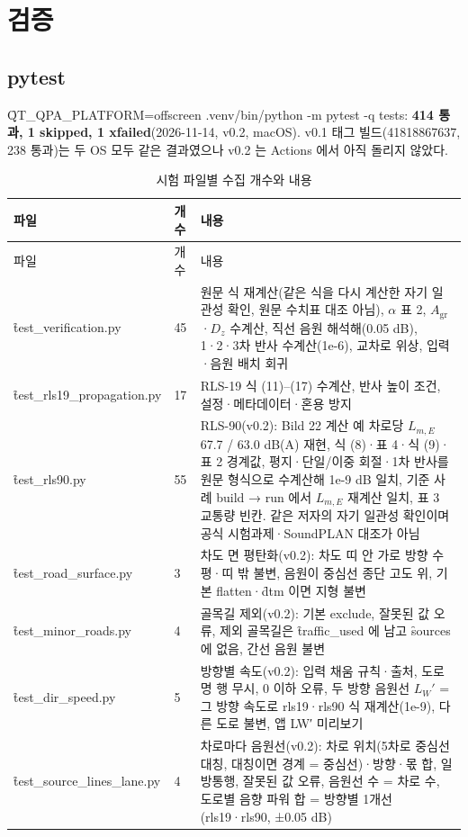 \documentclass[10.5pt,a4paper]{article}
\begin{document}
\section{검증}

\subsection{pytest}
\f{QT\_QPA\_PLATFORM=offscreen .venv/bin/python -m pytest -q tests}: \textbf{414 통과, 1 skipped, 1 xfailed}(2026-11-14, v0.2, macOS). v0.1 태그 빌드(41818867637, 238 통과)는 두 OS 모두 같은 결과였으나 v0.2 는 Actions 에서 아직 돌리지 않았다.
\begin{longtable}{P{52mm}P{10mm}P{90mm}}
\caption{시험 파일별 수집 개수와 내용}\label{tab:tests}\\
\toprule 파일 & 개수 & 내용 \\ \midrule\endfirsthead
\toprule 파일 & 개수 & 내용 \\ \midrule\endhead
\f{test\_verification.py} & 45 & 원문 식 재계산(같은 식을 다시 계산한 자기 일관성 확인, 원문 수치표 대조 아님), $\alpha$ 표 2, $A_\mathrm{gr}$·$D_z$ 수계산, 직선 음원 해석해(0.05 dB), 1·2·3차 반사 수계산(1e-6), 교차로 위상, 입력·음원 배치 회귀 \\
\f{test\_rls19\_propagation.py} & 17 & RLS-19 식 (11)–(17) 수계산, 반사 높이 조건, 설정·메타데이터·혼용 방지 \\
\f{test\_rls90.py} & 55 & RLS-90(v0.2): Bild 22 계산 예 차로당 $L_{m,E}$ 67.7 / 63.0 dB(A) 재현, 식 (8)·표 4·식 (9)·표 2 경계값, 평지·단일/이중 회절·1차 반사를 원문 형식으로 수계산해 1e-9 dB 일치, 기준 사례 build → run 에서 $L_{m,E}$ 재계산 일치, 표 3 교통량 빈칸. 같은 저자의 자기 일관성 확인이며 공식 시험과제·SoundPLAN 대조가 아님 \\
\f{test\_road\_surface.py} & 3 & 차도 면 평탄화(v0.2): 차도 띠 안 가로 방향 수평·띠 밖 불변, 음원이 중심선 종단 고도 위, 기본 flatten·\f{dtm} 이면 지형 불변 \\
\f{test\_minor\_roads.py} & 4 & 골목길 제외(v0.2): 기본 exclude, 잘못된 값 오류, 제외 골목길은 \f{traffic\_used} 에 남고 \f{sources} 에 없음, 간선 음원 불변 \\
\f{test\_dir\_speed.py} & 5 & 방향별 속도(v0.2): 입력 채움 규칙·출처, 도로명 행 무시, 0 이하 오류, 두 방향 음원선 $L_W'$ = 그 방향 속도로 rls19·rls90 식 재계산(1e-9), 다른 도로 불변, 앱 LW′ 미리보기 \\
\f{test\_source\_lines\_lane.py} & 4 & 차로마다 음원선(v0.2): 차로 위치(5차로 중심선 대칭, 대칭이면 경계 = 중심선)·방향·몫 합, 일방통행, 잘못된 값 오류, 음원선 수 = 차로 수, 도로별 음향 파워 합 = 방향별 1개선(rls19·rls90, ±0.05 dB) \\

\end{longtable}
\end{document}
